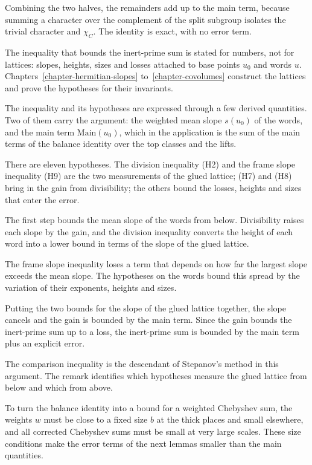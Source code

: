 Combining the two halves, the remainders add up to the main term, because
summing a character over the complement of the split subgroup isolates the
trivial character and $\chi_C$. The identity is exact, with no error term.

The inequality that bounds the inert-prime sum is stated for numbers, not for
lattices: slopes, heights, sizes and losses attached to base points $u_0$ and
words $u$. Chapters~\ref{chapter-hermitian-slopes} to~\ref{chapter-covolumes}
construct the lattices and prove the hypotheses for their invariants.

The inequality and its hypotheses are expressed through a few derived
quantities. Two of them carry the argument: the weighted mean slope $s(u_0)$
of the words, and the main term $\mathrm{Main}(u_0)$, which in the application
is the sum of the main terms of the balance identity over the top classes and
the lifts.

There are eleven hypotheses. The division inequality (H2) and the frame slope
inequality (H9) are the two measurements of the glued lattice; (H7) and (H8)
bring in the gain from divisibility; the others bound the losses, heights and
sizes that enter the error.

The first step bounds the mean slope of the words from below. Divisibility
raises each slope by the gain, and the division inequality converts the height
of each word into a lower bound in terms of the slope of the glued lattice.

The frame slope inequality loses a term that depends on how far the largest
slope exceeds the mean slope. The hypotheses on the words bound this spread by
the variation of their exponents, heights and sizes.

Putting the two bounds for the slope of the glued lattice together, the slope
cancels and the gain is bounded by the main term. Since the gain bounds the
inert-prime sum up to a loss, the inert-prime sum is bounded by the main term
plus an explicit error.

The comparison inequality is the descendant of Stepanov's method in this
argument. The remark identifies which hypotheses measure the glued lattice from
below and which from above.

To turn the balance identity into a bound for a weighted Chebyshev sum, the
weights $w$ must be close to a fixed size $b$ at the thick places and small
elsewhere, and all corrected Chebyshev sums must be small at very large
scales.
These size conditions make the error terms of the next lemmas smaller than the
main quantities.

